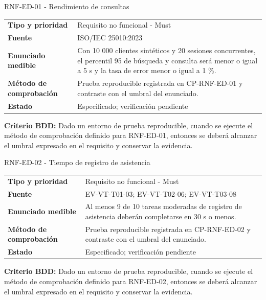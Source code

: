 \documentclass[11pt,a4paper]{article}
\begin{document}
\begin{reqbox}[colframe=Teal]{RNF-ED-01 - Rendimiento de consultas}
\begin{tabularx}{\textwidth}{>{\bfseries}p{3.2cm}Y}
Tipo y prioridad & Requisito no funcional - Must \\
Fuente & ISO/IEC 25010:2023 \\
Enunciado medible & Con 10 000 clientes sintéticos y 20 sesiones concurrentes, el percentil 95 de búsqueda y consulta será menor o igual a 5 s y la tasa de error menor o igual a 1 \%. \\
Método de comprobación & Prueba reproducible registrada en CP-RNF-ED-01 y contraste con el umbral del enunciado. \\
Estado & Especificado; verificación pendiente \\
\end{tabularx}
\textbf{Criterio BDD:} Dado un entorno de prueba reproducible, cuando se ejecute el método de comprobación definido para RNF-ED-01, entonces se deberá alcanzar el umbral expresado en el requisito y conservar la evidencia.
\end{reqbox}


\begin{reqbox}[colframe=Teal]{RNF-ED-02 - Tiempo de registro de asistencia}
\begin{tabularx}{\textwidth}{>{\bfseries}p{3.2cm}Y}
Tipo y prioridad & Requisito no funcional - Must \\
Fuente & EV-VT-T01-03; EV-VT-T02-06; EV-VT-T03-08 \\
Enunciado medible & Al menos 9 de 10 tareas moderadas de registro de asistencia deberán completarse en 30 s o menos. \\
Método de comprobación & Prueba reproducible registrada en CP-RNF-ED-02 y contraste con el umbral del enunciado. \\
Estado & Especificado; verificación pendiente \\
\end{tabularx}
\textbf{Criterio BDD:} Dado un entorno de prueba reproducible, cuando se ejecute el método de comprobación definido para RNF-ED-02, entonces se deberá alcanzar el umbral expresado en el requisito y conservar la evidencia.
\end{reqbox}
\end{document}
